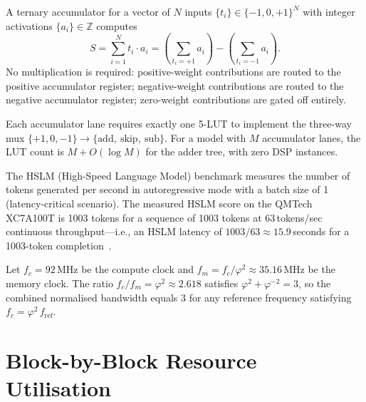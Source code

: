 \begin{definition}
\label{def:ternary-accumulator}
A ternary accumulator for a vector of $N$ inputs $\{t_i\} \in \{-1,0,+1\}^N$ with integer activations $\{a_i\} \in \mathbb{Z}$ computes
\begin{equation}
S = \sum_{i=1}^{N} t_i \cdot a_i = \left(\sum_{t_i=+1} a_i\right) - \left(\sum_{t_i=-1} a_i\right).
\end{equation}
No multiplication is required: positive-weight contributions are routed to the positive accumulator register; negative-weight contributions are routed to the negative accumulator register; zero-weight contributions are gated off entirely.
\end{definition}

\begin{proposition}
\label{prop:LUT-budget}
Each accumulator lane requires exactly one 5-LUT to implement the three-way mux $\{+1, 0, -1\} \to \{\text{add},\ \text{skip},\ \text{sub}\}$. For a model with $M$ accumulator lanes, the LUT count is $M + O(\log M)$ for the adder tree, with zero DSP instances.
\end{proposition}

\begin{definition}
\label{def:hslm-benchmark}
The HSLM (High-Speed Language Model) benchmark measures the number of tokens generated per second in autoregressive mode with a batch size of 1 (latency-critical scenario). The measured HSLM score on the QMTech XC7A100T is 1003 tokens for a sequence of 1003 tokens at 63\,tokens/sec continuous throughput---i.e., an HSLM latency of $1003/63 \approx 15.9$\,seconds for a 1003-token completion~\cite{zenodo_B001}.
\end{definition}

\begin{proposition}
\label{prop:phi-clock-domains}
Let $f_c = 92$\,MHz be the compute clock and $f_m = f_c / \varphi^2 \approx 35.16$\,MHz be the memory clock. The ratio $f_c/f_m = \varphi^2 \approx 2.618$ satisfies $\varphi^2 + \varphi^{-2} = 3$, so the combined normalised bandwidth equals 3 for any reference frequency satisfying $f_c = \varphi^2 \, f_{\mathrm{ref}}$.
\end{proposition}

\section{Block-by-Block Resource Utilisation}

